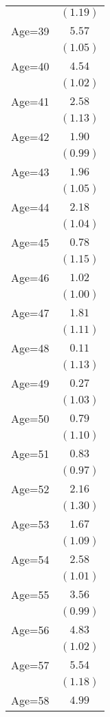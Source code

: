 \documentclass[fullpage]{paper}
\begin{document}
\begin{center}
\begin{longtable}{l c }
            & $(1.19)$ \\
Age=39      & $5.57$   \\
            & $(1.05)$ \\
Age=40      & $4.54$   \\
            & $(1.02)$ \\
Age=41      & $2.58$   \\
            & $(1.13)$ \\
Age=42      & $1.90$   \\
            & $(0.99)$ \\
Age=43      & $1.96$   \\
            & $(1.05)$ \\
Age=44      & $2.18$   \\
            & $(1.04)$ \\
Age=45      & $0.78$   \\
            & $(1.15)$ \\
Age=46      & $1.02$   \\
            & $(1.00)$ \\
Age=47      & $1.81$   \\
            & $(1.11)$ \\
Age=48      & $0.11$   \\
            & $(1.13)$ \\
Age=49      & $0.27$   \\
            & $(1.03)$ \\
Age=50      & $0.79$   \\
            & $(1.10)$ \\
Age=51      & $0.83$   \\
            & $(0.97)$ \\
Age=52      & $2.16$   \\
            & $(1.30)$ \\
Age=53      & $1.67$   \\
            & $(1.09)$ \\
Age=54      & $2.58$   \\
            & $(1.01)$ \\
Age=55      & $3.56$   \\
            & $(0.99)$ \\
Age=56      & $4.83$   \\
            & $(1.02)$ \\
Age=57      & $5.54$   \\
            & $(1.18)$ \\
Age=58      & $4.99$   \\

\end{longtable}
\end{center}
\end{document}
